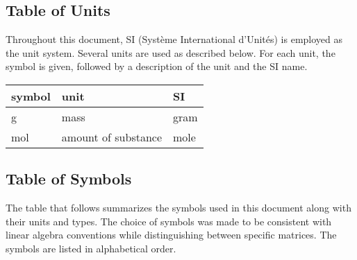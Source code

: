 \documentclass[12pt]{article}
\begin{document}
\subsection{Table of Units} \label{sec_ToU}

Throughout this document, SI (Syst\`{e}me International d'Unit\'{e}s) is employed
as the unit system.
Several units are
used as described below.  For each unit, the symbol is given, followed by a
description of the unit and the SI name.
~\newline

\renewcommand{\arraystretch}{1.2}
\noindent \begin{tabular}{l l l}
  \toprule
  \textbf{symbol} & \textbf{unit}       & \textbf{SI} \\
  \midrule
  \si{\gram}      & mass                & gram        \\
  \si{\mole}      & amount of substance & mole        \\
  \bottomrule
\end{tabular}


\newpage

\subsection{Table of Symbols} \label{sec_tabSymbs}

The table that follows summarizes the symbols used in this document along with
their units and types. The choice of symbols was made to be consistent with
linear algebra conventions while distinguishing between specific matrices.  The
symbols are listed in alphabetical order.

\end{document}
